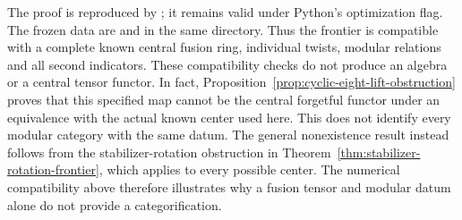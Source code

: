 The proof is reproduced by
; it remains
valid under Python's optimization flag. The frozen data are
 and
 in the same directory.
Thus the frontier is compatible with a complete known central fusion ring,
individual twists, modular relations and all second indicators.
These compatibility checks do not produce an algebra or a central tensor
functor. In fact, Proposition~\ref{prop:cyclic-eight-lift-obstruction}
proves that this specified map cannot be the central forgetful functor
under an equivalence with the actual known center used here. This does
not identify every modular category with the same datum. The general
nonexistence result instead follows from the stabilizer-rotation
obstruction in Theorem~\ref{thm:stabilizer-rotation-frontier}, which
applies to every possible center. The numerical compatibility above
therefore illustrates why a fusion tensor and modular datum alone do
not provide a categorification.
